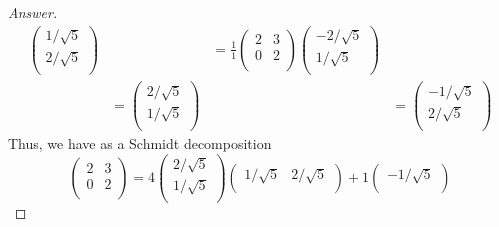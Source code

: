 \documentclass[../psets.tex]{subfiles}
\begin{document}
\begin{enumerate}[label={\textbf{3.\arabic*.}}]
\begin{proof}[Answer]
\begin{align*}
            \begin{pmatrix}
                1/\sqrt{5}\\
                2/\sqrt{5}\\
            \end{pmatrix}&
                &= \frac{1}{1}
                \begin{pmatrix}
                    2 & 3\\
                    0 & 2\\
                \end{pmatrix}
                \begin{pmatrix}
                    -2/\sqrt{5}\\
                    1/\sqrt{5}\\
                \end{pmatrix}\\
            &=
            \begin{pmatrix}
                2/\sqrt{5}\\
                1/\sqrt{5}\\
            \end{pmatrix}&
                &=
                \begin{pmatrix}
                    -1/\sqrt{5}\\
                    2/\sqrt{5}\\
                \end{pmatrix}
        \end{align*}
        Thus, we have as a Schmidt decomposition
        \begin{equation*}
            \begin{pmatrix}
                2 & 3\\
                0 & 2\\
            \end{pmatrix}
            = 4
            \begin{pmatrix}
                2/\sqrt{5}\\
                1/\sqrt{5}\\
            \end{pmatrix}
            \begin{pmatrix}
                1/\sqrt{5} & 2/\sqrt{5}\\
            \end{pmatrix}
            +1
            \begin{pmatrix}
                -1/\sqrt{5}\\

\end{pmatrix}
\end{equation*}
\end{proof}
\end{enumerate}
\end{document}
